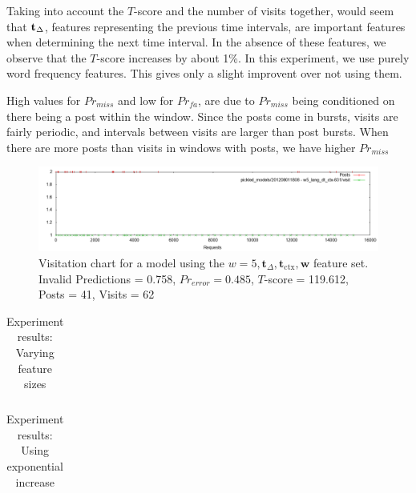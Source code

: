 \documentclass[12 pt]{article}
\begin{document}
Taking into account the $T$-score and the number of visits together, would seem that $\mathbf{t}_\Delta$, features representing the previous time intervals, are important features when determining the next time interval. In the absence of these features, we observe that the $T$-score increases by about 1\%. In this experiment, we use purely word frequency features. This gives only a slight improvent over not using them.

High values for $Pr_{miss}$ and low for $Pr_{fa}$, are due to $Pr_{miss}$ being conditioned on there being a post within the window. Since the posts come in bursts, visits are fairly periodic, and intervals between visits are larger than post bursts. When there are more posts than visits in windows with posts, we have higher $Pr_{miss}$

\begin{landscape}
\begin{figure}
	\centering
	\includegraphics[scale=0.5]{example_seq.png}
	\caption{Visitation chart for a model using the $w=5, \mathbf{t}_\Delta, \mathbf{t}_{\text{ctx}},\mathbf{w}$ feature set. Invalid Predictions = 0.758, $Pr_{error} =  0.485$, $T$-score = 119.612, Posts = 41, Visits = 62}
\end{figure}
\end{landscape}

\begin{table}
	\footnotesize
	\begin{centering}
	\begin{tabular}{|l|c|c|c|c|c|c|c|c|}
	\hline
	
	\hline
	\end{tabular}
	\caption{Experiment results: Varying feature sizes}
	\label{exp_f_size}
\end{centering}
\end{table}

\begin{table}
	\footnotesize
	\begin{centering}
	\begin{tabular}{|l|c|c|c|c|c|c|c|c|}
	\hline
	
	\hline
	\end{tabular}
	\caption{Experiment results: Using exponential increase}
	\label{exp_exp}
\end{centering}
\end{table}
\end{document}
